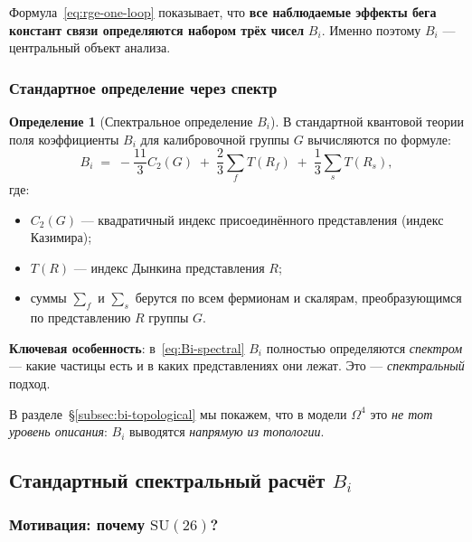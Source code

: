 \documentclass[11pt,a4paper]{article}
\newcommand{\SU}{\ensuremath{\mathrm{SU}}}
\newcommand{\Om}{\ensuremath{\Omega^4}}
\theoremstyle{definition}
\newtheorem{definition}[theorem]{Определение}
\begin{document}
\medskip\noindent
Формула~\eqref{eq:rge-one-loop} показывает, что \textbf{все
наблюдаемые эффекты бега констант связи определяются набором
трёх чисел} $B_i$. Именно поэтому $B_i$ --- центральный объект
анализа.

\subsubsection{Стандартное определение через спектр}

\begin{definition}[Спектральное определение $B_i$]
\label{def:Bi-spectral}
В стандартной квантовой теории поля коэффициенты $B_i$ для
калибровочной группы $G$ вычисляются по формуле:
\begin{equation}
    \boxed{
    B_i \;=\; -\frac{11}{3} C_2(G)
    \;+\; \frac{2}{3} \sum_{f} T(R_f)
    \;+\; \frac{1}{3} \sum_{s} T(R_s),
    }
    \label{eq:Bi-spectral}
\end{equation}
где:
\begin{itemize}
    \item $C_2(G)$ --- квадратичный индекс присоединённого
          представления (индекс Казимира);
    \item $T(R)$ --- индекс Дынкина представления $R$;
    \item суммы $\sum_f$ и $\sum_s$ берутся по всем фермионам
          и скалярам, преобразующимся по представлению $R$ группы $G$.
\end{itemize}
\end{definition}

\medskip\noindent
\textbf{Ключевая особенность}: в~\eqref{eq:Bi-spectral} $B_i$
полностью определяются \emph{спектром} --- какие частицы есть
и в каких представлениях они лежат. Это --- \emph{спектральный}
подход.

В разделе~\S\ref{subsec:bi-topological} мы покажем, что в модели
$\Om$ это \emph{не тот уровень описания}: $B_i$ выводятся
\emph{напрямую из топологии}.

\subsection{Стандартный спектральный расчёт \texorpdfstring{$B_i$}{B\_i}}
\label{subsec:bi-standard}

\subsubsection{Мотивация: почему \texorpdfstring{$\SU(26)$}{(26)}?}
\end{document}
